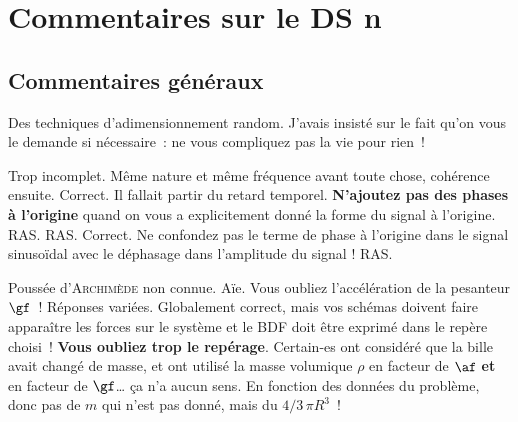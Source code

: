 \documentclass[a4paper, 12pt, final, garamond]{book}
\begin{document}
\setcounter{chapter}{4}

\chapter{Commentaires sur le DS n}

\section{Commentaires généraux}

Des techniques d'adimensionnement random. J'avais insisté sur le fait qu'on vous
le demande si nécessaire~: ne vous compliquez pas la vie pour rien~!


\setcounter{section}{0}
\begin{enumerate}
	Trop incomplet. Même nature et même fréquence avant toute chose, cohérence
	ensuite.
	Correct.
	Il fallait partir du retard temporel. \textbf{N'ajoutez pas des phases à
		l'origine} quand on vous a explicitement donné la forme du signal à l'origine.
	RAS.
	RAS.
	Correct.
	Ne confondez pas le terme de phase à l'origine dans le signal sinusoïdal avec
	le déphasage dans l'amplitude du signal !
	RAS.
\end{enumerate}

\begin{enumerate}
	Poussée d'\textsc{Archimède} non connue. Aïe. Vous oubliez l'accélération de
	la pesanteur $\gf$~!
	Réponses variées.
	Globalement correct, mais vos schémas doivent faire apparaître les forces sur
	le système et le BDF doit être exprimé dans le repère choisi~! \textbf{Vous
		oubliez trop le repérage}.
	Certain-es ont considéré que la bille avait changé de masse, et ont utilisé la
	masse volumique $\rho$ en facteur de $\af$ \textbf{et} en facteur de $\gf$… ça
	n'a aucun sens.
	En fonction des données du problème, donc pas de $m$ qui n'est pas donné, mais
	du $4/3\,\pi R^{3}$~!
\end{enumerate}
\end{document}
